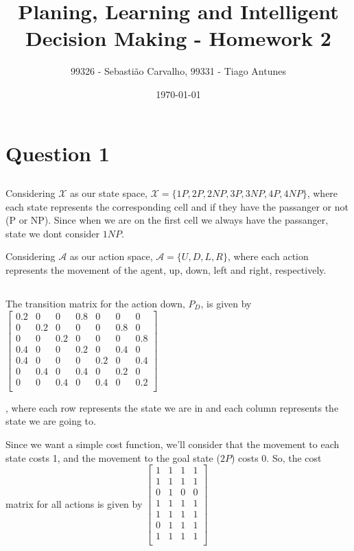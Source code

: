 \documentclass{article}
\title{Planing, Learning and Intelligent Decision Making - Homework 2}
\author{99326 - Sebastião Carvalho, 99331 - Tiago Antunes}
\date{\today}
\begin{document}
\maketitle

\tableofcontents

\section{Question 1}

\subsection{}

Considering $\mathcal{X}$ as our state space, $\mathcal{X} = \{1P, 2P, 2NP, 3P, 3NP, 4P, 4NP\}$, 
where each state represents the corresponding cell and if they have the passanger or not (P or NP). 
Since when we are on the first cell we always have the passanger, state we dont consider $1NP$.

Considering $\mathcal{A}$ as our action space, $\mathcal{A} = \{U, D, L, R\}$, 
where each action represents the movement of the agent, up, down, left and right, respectively.

\subsection{}

The transition matrix for the action down, $P_D$, is given by
$\begin{bmatrix}
    0.2 & 0 & 0 & 0.8 & 0 & 0 & 0 \\
    0 & 0.2 & 0 & 0 & 0 & 0.8 & 0 \\
    0 & 0 & 0.2 & 0 & 0 & 0 & 0.8 \\
    0.4 & 0 & 0 & 0.2 & 0 & 0.4 & 0 \\
    0.4 & 0 & 0 & 0 & 0.2 & 0 & 0.4 \\
    0 & 0.4 & 0 & 0.4 & 0 & 0.2 & 0 \\
    0 & 0 & 0.4 & 0 & 0.4 & 0 & 0.2 \\
\end{bmatrix}$

\medskip

, where each row represents the state we are in and each column represents the state we are going to.

\bigskip

Since we want a simple cost function, we'll consider that the movement to each state costs 1,
and the movement to the goal state ($2P$) costs 0. So, the cost matrix for all actions is given by
$\begin{bmatrix}
    1 & 1 & 1 & 1 \\
    1 & 1 & 1 & 1 \\
    0 & 1 & 0 & 0 \\
    1 & 1 & 1 & 1 \\
    1 & 1 & 1 & 1 \\
    0 & 1 & 1 & 1 \\
    1 & 1 & 1 & 1 \\
\end{bmatrix}$
\end{document}
